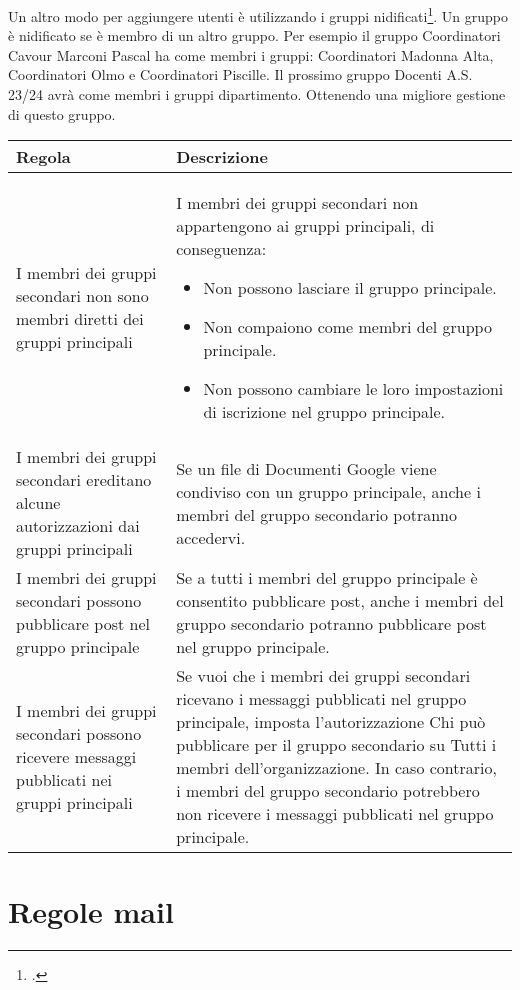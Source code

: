Un altro modo per aggiungere utenti è utilizzando i gruppi nidificati\footcite{Google2023a}. Un gruppo è nidificato se è membro di un altro gruppo. Per esempio il gruppo Coordinatori Cavour Marconi Pascal ha come membri i gruppi: Coordinatori Madonna Alta, Coordinatori Olmo e Coordinatori Piscille. Il prossimo gruppo Docenti A.S. 23/24 avrà come membri i gruppi dipartimento. Ottenendo una migliore gestione di questo gruppo.
\begin{center}
	\begin{tabularx}{\linewidth}{>{\setlength\hsize{.8\hsize}}X>{\setlength\hsize{\hsize}\setlength\linewidth{\hsize}}X}
\toprule	
Regola&	Descrizione\\
\midrule
I membri dei gruppi secondari non sono membri diretti dei gruppi principali	&
I membri dei gruppi secondari non appartengono ai gruppi principali, di conseguenza:
\begin{itemize}
	\item Non possono lasciare il gruppo principale.
	\item Non compaiono come membri del gruppo principale.
	\item Non possono cambiare le loro impostazioni di iscrizione nel gruppo principale.
\end{itemize}\\
I membri dei gruppi secondari ereditano alcune autorizzazioni dai gruppi principali&
Se un file di Documenti Google viene condiviso con un gruppo principale, anche i membri del gruppo secondario potranno accedervi.\\
I membri dei gruppi secondari possono pubblicare post nel gruppo principale&
Se a tutti i membri del gruppo principale è consentito pubblicare post, anche i membri del gruppo secondario potranno pubblicare post nel gruppo principale.\\
I membri dei gruppi secondari possono ricevere messaggi pubblicati nei gruppi principali&Se vuoi che i membri dei gruppi secondari ricevano i messaggi pubblicati nel gruppo principale, imposta l'autorizzazione Chi può pubblicare per il gruppo secondario su Tutti i membri dell'organizzazione. In caso contrario, i membri del gruppo secondario potrebbero non ricevere i messaggi pubblicati nel gruppo principale.\\
\bottomrule
\end{tabularx}
\end{center}
\section{Regole mail}
